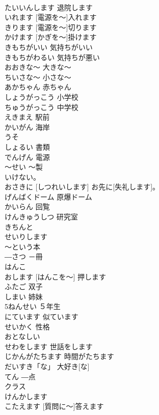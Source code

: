 \documentclass[8pt]{extreport}
\begin{document}
\begin{CJK}{UTF8}{min}
\\	たいいんします	退院します	
\\	[でんげんを～] いれます	[電源を～]入れます	
\\	[でんげんを～]きります	[電源を～]切ります	
\\	[かぎを～]かけます	[かぎを～]掛けます	
\\	きもちがいい	気持ちがいい	
\\	きもちがわるい	気持ちが悪い	
\\	おおきな～	大きな～	
\\	ちいさな～	小さな～	
\\	あかちゃん	赤ちゃん	
\\	しょうがっこう	小学校	
\\	ちゅうがっこう	中学校	
\\	えきまえ	駅前	
\\	かいがん	海岸	
\\	うそ			
\\	しょるい	書類	
\\	でんげん	電源	
\\	～せい	～製	
\\	[あ、]いけない。			
\\	おさきに [しつれいします]	お先に[失礼します]。	
\\	げんばくドーム	原爆ドーム	
\\	かいらん	回覧	
\\	けんきゅうしつ	研究室	
\\	きちんと			
\\	せいりします			
\\	～という本		
\\	―さつ	－冊	
\\	はんこ			
\\	[はんこを～]おします	[はんこを～] 押します	
\\	ふたご	双子	
\\	しまい	姉妹	
\\	5ねんせい	５年生	
\\	にています	似ています	
\\	せいかく	性格	
\\	おとなしい			
\\	せわをします	世話をします	
\\	じかんがたちます	時間がたちます	
\\	だいすき「な」	大好き[な]	
\\	てん	―点	
\\	クラス			
\\	けんかします			
\\	[しつもんに～]こたえます	[質問に～]答えます	

\end{CJK}
\end{document}
